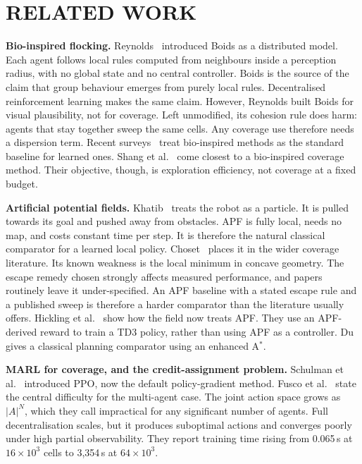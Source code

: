 \documentclass[a4paper, 10pt, conference]{ieeeconf}
\begin{document}
\section{RELATED WORK}\label{sec:related}

\textbf{Bio-inspired flocking.} Reynolds~\cite{reynolds1987}
introduced Boids as a distributed model. Each agent follows local
rules computed from neighbours inside a perception radius, with no
global state and no central controller. Boids is the source of the
claim that group behaviour emerges from purely local rules.
Decentralised reinforcement learning makes the same claim. However,
Reynolds built Boids for visual plausibility, not for coverage. Left
unmodified, its cohesion rule does harm: agents that stay together
sweep the same cells. Any coverage use therefore needs a dispersion
term. Recent surveys~\cite{xu2022,alqudsi2024,arshid2025} treat
bio-inspired methods as the standard baseline for learned ones. Shang
et al.~\cite{shang2025} come closest to a bio-inspired coverage
method. Their objective, though, is exploration efficiency, not
coverage at a fixed budget.

\textbf{Artificial potential fields.} Khatib~\cite{khatib1986} treats
the robot as a particle. It is pulled towards its goal and pushed away
from obstacles. APF is fully local, needs no map, and costs constant
time per step. It is therefore the natural classical comparator for a
learned local policy. Choset~\cite{choset2001} places it in the wider
coverage literature. Its known weakness is the local minimum in
concave geometry. The escape remedy chosen strongly affects measured
performance, and papers routinely leave it under-specified. An APF
baseline with a stated escape rule and a published sweep is therefore
a harder comparator than the literature usually offers. Hickling et
al.~\cite{hickling2025} show how the field now treats APF. They use an
APF-derived reward to train a TD3 policy, rather than using APF as a
controller. Du~\cite{du2023} gives a classical planning comparator
using an enhanced A$^*$.

\textbf{MARL for coverage, and the credit-assignment problem.}
Schulman et al.~\cite{schulman2017} introduced PPO, now the default
policy-gradient method. Fusco et al.~\cite{fusco2025} state the
central difficulty for the multi-agent case. The joint action space
grows as $|A|^N$, which they call impractical for any significant
number of agents. Full decentralisation scales, but it produces
suboptimal actions and converges poorly under high partial
observability. They report training time rising from 0.065\,s at
$16\times10^3$ cells to 3{,}354\,s at $64\times10^3$.
\end{document}
